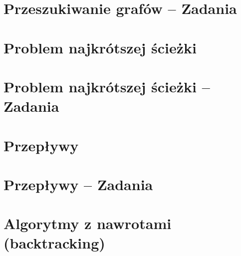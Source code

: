 \section{Przeszukiwanie grafów -- Zadania}

\section{Problem najkrótszej ścieżki}

\section{Problem najkrótszej ścieżki -- Zadania}

\section{Przepływy}

\section{Przepływy -- Zadania}

\section{Algorytmy z nawrotami (backtracking)}

